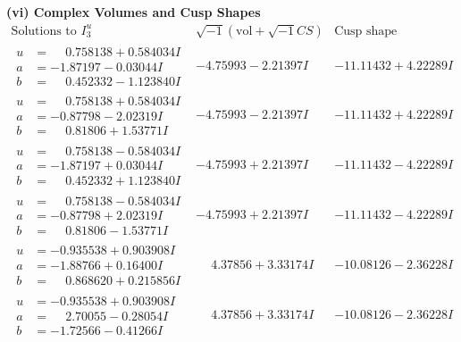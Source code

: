 \documentclass[1p]{elsarticle_modified}
\theoremstyle{definition}
\newcommand{\I}{\sqrt{-1}}
\begin{document}
\newpage\flushleft \textbf{(vi) Complex Volumes and Cusp Shapes}
$$\begin{array}{c|c|c}  
\text{Solutions to }I^u_{3}& \I (\text{vol} + \sqrt{-1}CS) & \text{Cusp shape}\\
 \hline 
\begin{aligned}
u &= \phantom{-}0.758138 + 0.584034 I \\
a &= -1.87197 - 0.03044 I \\
b &= \phantom{-}0.452332 - 1.123840 I\end{aligned}
 & -4.75993 - 2.21397 I & -11.11432 + 4.22289 I \\ \hline\begin{aligned}
u &= \phantom{-}0.758138 + 0.584034 I \\
a &= -0.87798 - 2.02319 I \\
b &= \phantom{-}0.81806 + 1.53771 I\end{aligned}
 & -4.75993 - 2.21397 I & -11.11432 + 4.22289 I \\ \hline\begin{aligned}
u &= \phantom{-}0.758138 - 0.584034 I \\
a &= -1.87197 + 0.03044 I \\
b &= \phantom{-}0.452332 + 1.123840 I\end{aligned}
 & -4.75993 + 2.21397 I & -11.11432 - 4.22289 I \\ \hline\begin{aligned}
u &= \phantom{-}0.758138 - 0.584034 I \\
a &= -0.87798 + 2.02319 I \\
b &= \phantom{-}0.81806 - 1.53771 I\end{aligned}
 & -4.75993 + 2.21397 I & -11.11432 - 4.22289 I \\ \hline\begin{aligned}
u &= -0.935538 + 0.903908 I \\
a &= -1.88766 + 0.16400 I \\
b &= \phantom{-}0.868620 + 0.215856 I\end{aligned}
 & \phantom{-}4.37856 + 3.33174 I & -10.08126 - 2.36228 I \\ \hline\begin{aligned}
u &= -0.935538 + 0.903908 I \\
a &= \phantom{-}2.70055 - 0.28054 I \\
b &= -1.72566 - 0.41266 I\end{aligned}
 & \phantom{-}4.37856 + 3.33174 I & -10.08126 - 2.36228 I \\ \hline\begin{aligned}

\end{aligned}
\end{array}$$
\end{document}
